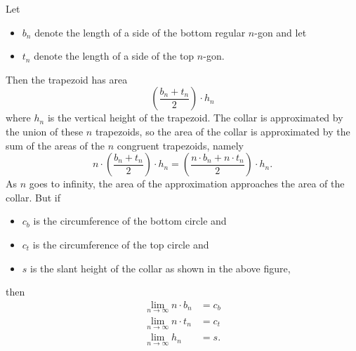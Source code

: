 \documentclass[hints,handout,noauthor,nooutcomes,12pt]{ximera}
\begin{document}
Let
\begin{itemize}
\item $b_{n}$ denote the length of a side of the bottom regular
  $n$-gon and let
\item $t_{n}$ denote the length of a side of the top $n$-gon. 
\end{itemize}
\begin{image}
\end{image}
Then the trapezoid has area
\[
\left(  \frac{b_{n}+t_{n}}{2}\right)  \cdot h_{n}%
\]
where $h_{n}$ is the vertical height of the trapezoid. The collar is
approximated by the union of these $n$ trapezoids, so the area of the collar
is approximated by the sum of the areas of the $n$ congruent trapezoids,
namely%
\[
n\cdot \left(  \frac{b_{n}+t_{n}}{2}\right)
\cdot h_{n}=\left(  \frac{n\cdot %
b_{n}+n\cdot t_{n}}{2}\right) \cdot h_{n}.
\]
As $n$ goes to infinity, the area of the approximation approaches the area of
the collar. But if 
\begin{itemize}
\item $c_{b}$ is the circumference of the bottom circle and 
\item $c_{t}$ is the circumference of the top circle and 
\item $s$ is the slant height of the collar as shown in the above
  figure,
\end{itemize}
then
\begin{align*}
\lim_{n\to \infty} n\cdot b_{n}  &  =c_{b}\\
\lim_{n\to \infty} n \cdot t_{n}  &  =c_{t}\\
\lim_{n\to \infty} h_{n}  &  =s.
\end{align*}
\end{document}
